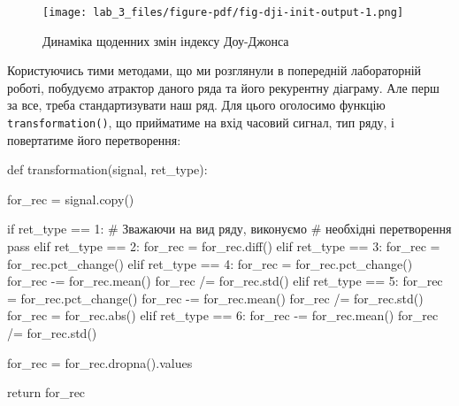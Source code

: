 \documentclass[
  letterpaper,
]{report}
\newenvironment{Shaded}{\begin{snugshade}}{\end{snugshade}}
\newcommand{\BuiltInTok}[1]{\textcolor[rgb]{0.00,0.23,0.31}{#1}}
\newcommand{\CommentTok}[1]{\textcolor[rgb]{0.37,0.37,0.37}{#1}}
\newcommand{\ControlFlowTok}[1]{\textcolor[rgb]{0.00,0.23,0.31}{#1}}
\newcommand{\DecValTok}[1]{\textcolor[rgb]{0.68,0.00,0.00}{#1}}
\newcommand{\KeywordTok}[1]{\textcolor[rgb]{0.00,0.23,0.31}{#1}}
\newcommand{\NormalTok}[1]{\textcolor[rgb]{0.00,0.23,0.31}{#1}}
\newcommand{\OperatorTok}[1]{\textcolor[rgb]{0.37,0.37,0.37}{#1}}
\begin{document}
\begin{figure}[H]

{\centering \texttt{[image: lab\_3\_files/figure-pdf/fig-dji-init-output-1.png]}

}

\caption{\label{fig-dji-init}Динаміка щоденних змін індексу Доу-Джонса}

\end{figure}

Користуючись тими методами, що ми розглянули в попередній лабораторній
роботі, побудуємо атрактор даного ряда та його рекурентну діаграму. Але
перш за все, треба стандартизувати наш ряд. Для цього оголосимо функцію
\texttt{transformation()}, що прийматиме на вхід часовий сигнал, тип
ряду, і повертатиме його перетворення:

\begin{Shaded}
\begin{Highlighting}[]
\KeywordTok{def}\NormalTok{ transformation(signal, ret\_type):}

\NormalTok{    for\_rec }\OperatorTok{=}\NormalTok{ signal.copy()}

    \ControlFlowTok{if}\NormalTok{ ret\_type }\OperatorTok{==} \DecValTok{1}\NormalTok{:       }\CommentTok{\# Зважаючи на вид ряду, виконуємо}
                            \CommentTok{\# необхідні перетворення}
        \ControlFlowTok{pass}
    \ControlFlowTok{elif}\NormalTok{ ret\_type }\OperatorTok{==} \DecValTok{2}\NormalTok{:}
\NormalTok{        for\_rec }\OperatorTok{=}\NormalTok{ for\_rec.diff()}
    \ControlFlowTok{elif}\NormalTok{ ret\_type }\OperatorTok{==} \DecValTok{3}\NormalTok{:}
\NormalTok{        for\_rec }\OperatorTok{=}\NormalTok{ for\_rec.pct\_change()}
    \ControlFlowTok{elif}\NormalTok{ ret\_type }\OperatorTok{==} \DecValTok{4}\NormalTok{:}
\NormalTok{        for\_rec }\OperatorTok{=}\NormalTok{ for\_rec.pct\_change()}
\NormalTok{        for\_rec }\OperatorTok{{-}=}\NormalTok{ for\_rec.mean()}
\NormalTok{        for\_rec }\OperatorTok{/=}\NormalTok{ for\_rec.std()}
    \ControlFlowTok{elif}\NormalTok{ ret\_type }\OperatorTok{==} \DecValTok{5}\NormalTok{: }
\NormalTok{        for\_rec }\OperatorTok{=}\NormalTok{ for\_rec.pct\_change()}
\NormalTok{        for\_rec }\OperatorTok{{-}=}\NormalTok{ for\_rec.mean()}
\NormalTok{        for\_rec }\OperatorTok{/=}\NormalTok{ for\_rec.std()}
\NormalTok{        for\_rec }\OperatorTok{=}\NormalTok{ for\_rec.}\BuiltInTok{abs}\NormalTok{()}
    \ControlFlowTok{elif}\NormalTok{ ret\_type }\OperatorTok{==} \DecValTok{6}\NormalTok{:}
\NormalTok{        for\_rec }\OperatorTok{{-}=}\NormalTok{ for\_rec.mean()}
\NormalTok{        for\_rec }\OperatorTok{/=}\NormalTok{ for\_rec.std()}

\NormalTok{    for\_rec }\OperatorTok{=}\NormalTok{ for\_rec.dropna().values}

    \ControlFlowTok{return}\NormalTok{ for\_rec}
\end{Highlighting}
\end{Shaded}
\end{document}
